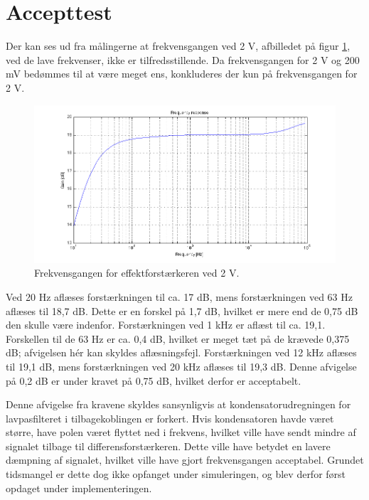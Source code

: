 \section{Accepttest}
Der kan ses ud fra målingerne at frekvensgangen ved 2 V, afbilledet på figur \ref{fig:acceff:frek2v}, ved de lave frekvenser, ikke er tilfredsstillende. Da frekvensgangen for 2 V og 200 mV bedømmes til at være meget ens, konkluderes der kun på frekvensgangen for 2 V.

\begin{figure}[h]
\centering
\includegraphics[width=\textwidth]{maalerapporter/effektforstaerker/2V-45mA-uden-modstand-frek.png}
\caption{Frekvensgangen for effektforstærkeren ved 2 V.}
\label{fig:acceff:frek2v}
\end{figure}

Ved 20 Hz aflæses forstærkningen til ca. 17 dB, mens forstærkningen ved 63 Hz aflæses til 18,7 dB. Dette er en forskel på 1,7 dB, hvilket er mere end de 0,75 dB den skulle være indenfor. Forstærkningen ved 1 kHz er aflæst til ca. 19,1. Forskellen til de 63 Hz er ca. 0,4 dB, hvilket er meget tæt på de krævede 0,375 dB; afvigelsen hér kan skyldes aflæsningsfejl. Forstærkningen ved 12 kHz aflæses til 19,1 dB, mens forstærkningen ved 20 kHz aflæses til 19,3 dB. Denne afvigelse på 0,2 dB er under kravet på 0,75 dB, hvilket derfor er acceptabelt.

Denne afvigelse fra kravene skyldes sansynligvis at kondensatorudregningen for lavpasfilteret i tilbagekoblingen er forkert. Hvis kondensatoren havde været større, have polen været flyttet ned i frekvens, hvilket ville have sendt mindre af signalet tilbage til differensforstærkeren. Dette ville have betydet en lavere dæmpning af signalet, hvilket ville have gjort frekvensgangen acceptabel. Grundet tidsmangel er dette dog ikke opfanget under simuleringen, og blev derfor først opdaget under implementeringen.


